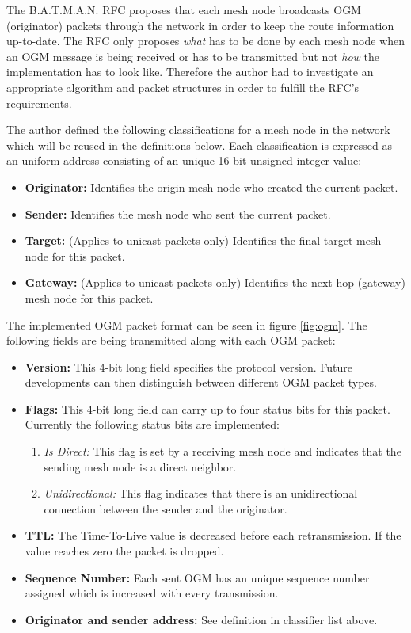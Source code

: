 The B.A.T.M.A.N. RFC \cite{batmanrfc} proposes that each mesh node broadcasts OGM (originator) packets through the network in order to keep the route information up-to-date. The RFC only proposes \emph{what} has to be done by each mesh node when an OGM message is being received or has to be transmitted but not \emph{how} the implementation has to look like. Therefore the author had to investigate an appropriate algorithm and packet structures in order to fulfill the RFC's requirements.

The author defined the following classifications for a mesh node in the network which will be reused in the definitions below. Each classification is expressed as an uniform address consisting of an unique 16-bit unsigned integer value:

\begin{itemize}
    \item \textbf{Originator:} Identifies the origin mesh node who created the current packet.
    \item \textbf{Sender:} Identifies the mesh node who sent the current packet.
    \item \textbf{Target:} (Applies to unicast packets only) Identifies the final target mesh node for this packet.
    \item \textbf{Gateway:} (Applies to unicast packets only) Identifies the next hop (gateway) mesh node for this packet.
\label{list:nodeclasses}
\end{itemize}

The implemented OGM packet format can be seen in figure \ref{fig:ogm}. The following fields are being transmitted along with each OGM packet:

\begin{itemize}
    \item \textbf{Version:} This 4-bit long field specifies the protocol version. Future developments can then distinguish between different OGM packet types.
    \item \textbf{Flags:} This 4-bit long field can carry up to four status bits for this packet. Currently the following status bits are implemented:
    \begin{enumerate}
        \item \emph{Is Direct:} This flag is set by a receiving mesh node and indicates that the sending mesh node is a direct neighbor.
        \item \emph{Unidirectional:} This flag indicates that there is an unidirectional connection between the sender and the originator.
    \end{enumerate}
    \item \textbf{TTL:} The Time-To-Live value is decreased before each retransmission. If the value reaches zero the packet is dropped.
    \item \textbf{Sequence Number:} Each sent OGM has an unique sequence number assigned which is increased with every transmission.
    \item \textbf{Originator and sender address:} See definition in classifier list above.
\end{itemize}


